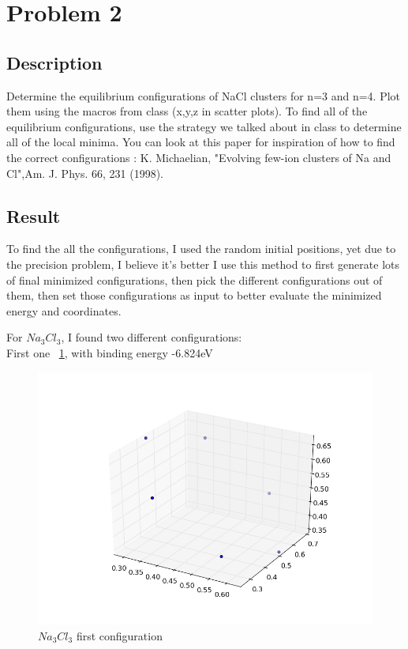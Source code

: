 \documentclass[11pt,letterpaper]{article}
\begin{document}
\newpage

\section{Problem 2}

\subsection{Description}
  Determine the equilibrium configurations of NaCl clusters for  n=3 and n=4. Plot them using the macros from class (x,y,z in scatter plots). To find all of the equilibrium configurations, use the strategy we talked about in class to determine all of the local minima. You can look at this paper for inspiration of how to find the correct configurations : K. Michaelian, "Evolving few-ion clusters of Na and Cl",Am. J. Phys. 66, 231 (1998). \cite{paper}

\subsection{Result}
To find the all the configurations, I used the random initial positions, yet due to the precision problem, I believe it's better I use this method to first generate lots of final minimized configurations, then pick the different configurations out of them, then set those configurations as input to better evaluate the minimized energy and coordinates. 

For $Na_3Cl_3$, I found two different configurations:\\

First one ~\ref{figure2}, with binding energy -6.824eV\\


\begin{figure}
\begin{center}
\includegraphics[width=0.8\linewidth,angle=0]{na3_1.png}
\caption{$Na_3Cl_3$ first configuration}
\label{figure2}
\end{center}
\end{figure}
\end{document}
